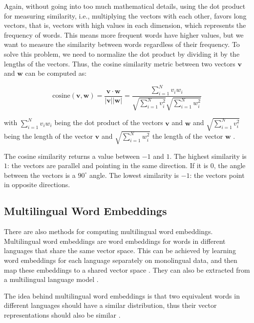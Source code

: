 Again, without going into too much mathematical details, using the dot product for measuring similarity, i.e., multiplying the vectors with each other, favors long vectors, that is, vectors with high values in each dimension, which represents the frequency of words. 
This means more frequent words have higher values, but we want to measure the similarity between words regardless of their frequency.
To solve this problem, we need to normalize the dot product by dividing it by the lengths of the vectors. 
Thus, the cosine similarity metric between two vectors $\mathbf{v}$ and $\mathbf{w}$ can be computed as:

\begin{equation}
	\text{cosine}(\mathbf{v}, \mathbf{w}) =
	\frac{
	\mathbf{v} \cdot \mathbf{w}
	}{|\mathbf{v}||\mathbf{w}|}
	=
	\frac{
	\sum_{i=1}^N v_i w_i
	}
	{
	\sqrt{\sum_{i=1}^N v_i^2} \sqrt{\sum_{i=1}^N w_i^2}
	}	
\end{equation}

with $\sum_{i=1}^Nv_iw_i$ being the dot product of the vectors $\mathbf{v}$ and $\mathbf{w}$ and $\sqrt{\sum_{i=1}^N v_i^2}$ being the length of the vector $\mathbf{v}$ and $\sqrt{\sum_{i=1}^N w_i^2}$ the length of the vector $\mathbf{w}$
\autocite[103-104]{jurafsky-2019}.

The cosine similarity returns a value between $-1$ and $1$. 
The highest  similarity is \(1\): the vectors are parallel and pointing in the same direction. 
If it is $0$, the angle between the vectors is a $90^\circ$ angle. 
The lowest similarity is $-1$: the vectors point in opposite directions.

\subsection{Multilingual Word Embeddings}
There are also methods for computing multilingual word embeddings. 
Multilingual word embeddings are word embeddings for words in different languages that share the same vector space. 
This can be achieved by learning word embeddings for each language separately on monolingual data, and then map these embeddings to a shared vector space \autocite{artetxe-etal-2018-robust}. 
They can also be extracted from a multilingual language model \autocite{jalili-sabet-etal-2020-simalign}.

The idea behind multilingual word embeddings is that two equivalent words in different languages should have a similar distribution, thus their vector representations should also be similar \autocite{artetxe-etal-2018-robust}. 

